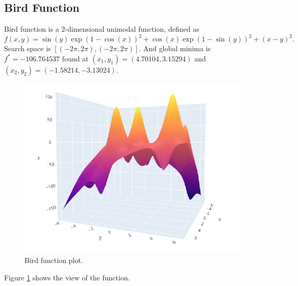 \subsection{Bird Function}
Bird function is a 2-dimensional unimodal function, defined as
$$ f(x, y) = \sin(y) \exp (1-\cos(x))^2 + \cos(x)\exp(1-\sin(y))^2 + (x - y)^2. $$
Search space is $ [ (-2\pi, 2\pi), (-2\pi, 2\pi) ] $. And global minima is $f^*=-106.764537$ found at $(x_1, y_1)=(4.70104, 3.15294)$ and $(x_2, y_2)=(-1.58214, -3.13024)$.
\begin{figure}
	\centering
	\includegraphics[scale=0.4]{figures/bird-function-plot.png}
	\caption{Bird function plot.}
	\label{fig:bird-function-plot}
\end{figure}
Figure \ref{fig:bird-function-plot} shows the view of the function.

